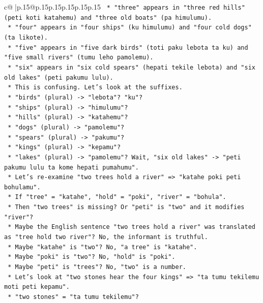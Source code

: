 \documentclass{article}
\begin{document}
{\begin{supertabular}{c@{$\;$}|p{.15\linewidth}@{}p{.15\linewidth}p{.15\linewidth}p{.15\linewidth}p{.15\linewidth}p{.15\linewidth}}
{{{\texttt{        *   "three" appears in "three red hills" (peti koti katahemu) and "three old boats" (pa himulumu).} \\
\texttt{        *   "four" appears in "four ships" (ku himulumu) and "four cold dogs" (ta likote).} \\
\texttt{        *   "five" appears in "five dark birds" (toti paku lebota ta ku) and "five small rivers" (tumu leho pamolemu).} \\
\texttt{        *   "six" appears in "six cold spears" (hepati tekile lebota) and "six old lakes" (peti pakumu lulu).} \\
\texttt{        *   This is confusing. Let's look at the suffixes.} \\
\texttt{        *   "birds" (plural) {-}> "lebota"? "ku"?} \\
\texttt{        *   "ships" (plural) {-}> "himulumu"?} \\
\texttt{        *   "hills" (plural) {-}> "katahemu"?} \\
\texttt{        *   "dogs" (plural) {-}> "pamolemu"?} \\
\texttt{        *   "spears" (plural) {-}> "pakumu"?} \\
\texttt{        *   "kings" (plural) {-}> "kepamu"?} \\
\texttt{        *   "lakes" (plural) {-}> "pamolemu"? Wait, "six old lakes" {-}> "peti pakumu lulu ta kome hepati pumahumu".} \\
\texttt{        *   Let's re{-}examine "two trees hold a river" => "katahe poki peti bohulamu".} \\
\texttt{        *   If "tree" = "katahe", "hold" = "poki", "river" = "bohula".} \\
\texttt{        *   Then "two trees" is missing? Or "peti" is "two" and it modifies "river"?} \\
\texttt{        *   Maybe the English sentence "two trees hold a river" was translated as "tree hold two river"? No, the informant is truthful.} \\
\texttt{        *   Maybe "katahe" is "two"? No, "a tree" is "katahe".} \\
\texttt{        *   Maybe "poki" is "two"? No, "hold" is "poki".} \\
\texttt{        *   Maybe "peti" is "trees"? No, "two" is a number.} \\
\texttt{        *   Let's look at "two stones hear the four kings" => "ta tumu tekilemu moti peti kepamu".} \\
\texttt{        *   "two stones" = "ta tumu tekilemu"?} \\
}}}
\end{supertabular}}
\end{document}
